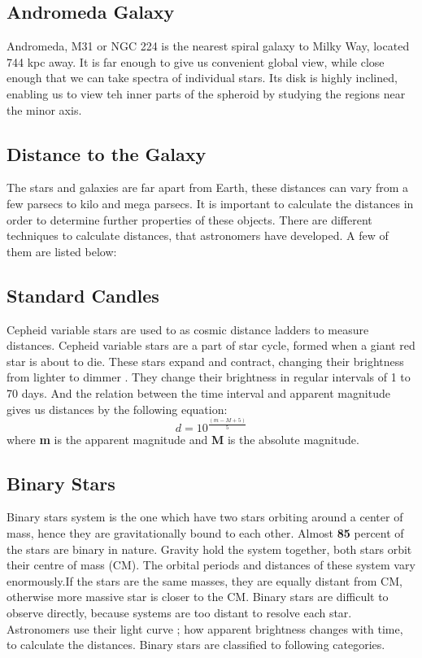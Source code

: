 \subsection{Andromeda Galaxy}
  Andromeda, M31 or NGC 224 is the nearest spiral galaxy to Milky Way, located 744 kpc away. It is far enough to give us convenient global view, while close enough that we can take spectra of individual stars. Its disk is highly inclined, enabling us to view teh inner parts of the spheroid by studying the regions near the minor axis. 

\subsection{Distance to the Galaxy}

The stars and galaxies are far apart from Earth, these distances can vary from a few parsecs to kilo and mega parsecs. It is important to calculate the distances in order to determine further properties of these objects. There are different techniques to calculate distances, that astronomers have developed.
A few of them are listed below:

\subsection{Standard Candles}
 Cepheid variable stars are used to as cosmic distance ladders to measure distances. Cepheid variable stars are a part of star cycle, formed when a giant red star is about to die. These stars expand and contract, changing their brightness from lighter to dimmer \cite{stanc}.  They change their brightness in regular intervals of 1 to 70 days. And the relation between the time interval and apparent magnitude gives us distances by the following equation:
 \begin{equation}
 d= 10^{\frac{(m-M+5)}{5}}
 \end{equation}
where \textbf{m} is the apparent magnitude and \textbf{M} is the absolute magnitude.

\subsection*{Binary Stars }

\cite{bin}Binary stars system is the one which have two stars orbiting around a center of mass, hence they are gravitationally bound to each other. Almost \textbf{85} percent of the stars are binary in nature. Gravity hold the system together, both stars orbit their centre of mass (CM). The orbital periods and distances of these system vary enormously.If the stars are the same masses, they are equally distant from CM, otherwise more massive star is closer to the CM. Binary stars are difficult to observe directly, because systems are too distant to resolve each star.  Astronomers use their light curve ; how apparent brightness changes with time, to calculate the distances. Binary stars are classified to following categories.

